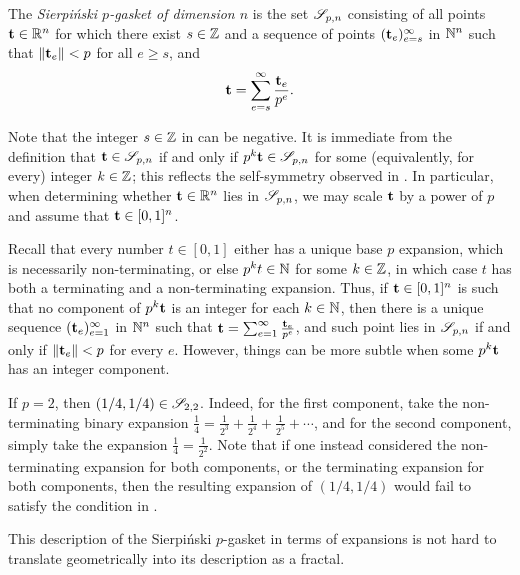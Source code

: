 \documentclass{article}
\begin{document}
\begin{definition}
   \label{sierpinski: D}
   The \emph{Sierpi\'nski $p$-gasket of dimension $n$} is the set $\mathscr{S}_{p,n}$ consisting of all points $\mathbf{t}\in \mathbb{R}^n$ for which there exist $s \in \mathbb{Z}$ and a sequence of points $( \mathbf{t}_e )_{e=s}^\infty$ in $\mathbb{N}^n$ such that $\| \mathbf{t}_e \| < p$ for all $e \geq s$, and
 \[
\mathbf{t} = \sum_{e=s}^{\infty} \frac{\mathbf{t}_e}{p^e}.
 \]
\end{definition}

Note that the integer $s \in \mathbb{Z}$ in  can be negative.
It is immediate from the definition that $\mathbf{t} \in \mathscr{S}_{p,n}$ if and only if $p^k  \mathbf{t} \in \mathscr{S}_{p,n}$ for some (equivalently, for every) integer $k \in \mathbb{Z}$; this reflects the self-symmetry observed in .
In particular, when determining whether $\mathbf{t} \in \mathbb{R}^n$ lies in $\mathscr{S}_{p,n}$, we may scale $\mathbf{t}$ by a power of $p$  and assume that $\mathbf{t} \in [0,1]^n$.

Recall that every number $t \in [0,1]$ either has a unique base $p$ expansion, which is necessarily non-terminating, or else $p^k t \in \mathbb{N}$ for some $k \in \mathbb{Z}$, in which case $t$ has both a terminating and a non-terminating expansion.
Thus, if $\mathbf{t} \in [0,1]^n$ is such that no component of $p^k \mathbf{t}$ is an integer for each $k \in \mathbb{N}$, then there is a unique sequence $( \mathbf{t}_e )_{e=1}^{\infty}$ in $ \mathbb{N}^n$ such that $\mathbf{t} = \sum_{e=1}^{\infty} \frac{\mathbf{t}_e}{p^e}$, and such point lies in ${\mathscr{S}}_{p,n}$ if and only if $\| \mathbf{t}_e \| < p$ for every  $e$.
However, things can be more subtle when some $p^k \mathbf{t}$ has an integer component.

\begin{example}
   If $p=2$, then $(1/4, 1/4) \in \mathscr{S}_{2,2}$.
   Indeed, for the first component, take the non-terminating binary expansion $\frac{1}{4} = \frac{1}{2^3} + \frac{1}{2^4} + \frac{1}{2^5} + \cdots$, and for the second component, simply take the expansion $\frac{1}{4} = \frac{1}{2^2}$.
   Note that if one instead considered the non-terminating expansion for both components, or the terminating expansion for both components, then the resulting expansion of $(1/4, 1/4)$ would fail to satisfy the condition in .
\end{example}

This description of the Sierpi\'nski $p$-gasket in terms of expansions is not hard to translate geometrically into its description as a fractal.
\end{document}
